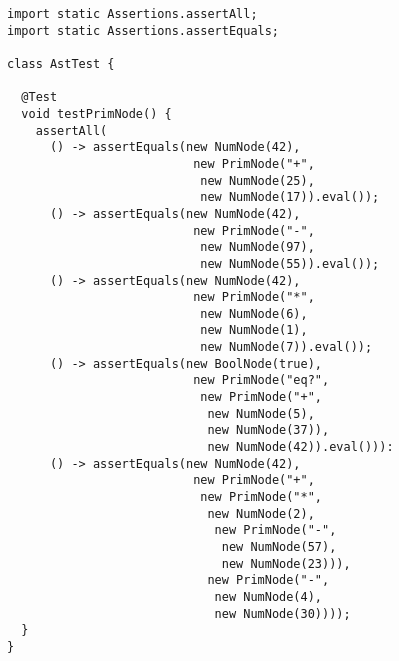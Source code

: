 \enlargethispage{-1\baselineskip}
\begin{lstlisting}[language=MyJava]
import static Assertions.assertAll;
import static Assertions.assertEquals;

class AstTest {

  @Test
  void testPrimNode() {
    assertAll(
      () -> assertEquals(new NumNode(42),
                          new PrimNode("+", 
                           new NumNode(25), 
                           new NumNode(17)).eval());
      () -> assertEquals(new NumNode(42),
                          new PrimNode("-", 
                           new NumNode(97), 
                           new NumNode(55)).eval());                         
      () -> assertEquals(new NumNode(42),
                          new PrimNode("*", 
                           new NumNode(6), 
                           new NumNode(1), 
                           new NumNode(7)).eval());
      () -> assertEquals(new BoolNode(true),
                          new PrimNode("eq?",
                           new PrimNode("+", 
                            new NumNode(5),
                            new NumNode(37)),
                            new NumNode(42)).eval())):
      () -> assertEquals(new NumNode(42),
                          new PrimNode("+",
                           new PrimNode("*",
                            new NumNode(2), 
                             new PrimNode("-",
                              new NumNode(57),
                              new NumNode(23))),
                            new PrimNode("-",
                             new NumNode(4),
                             new NumNode(30))));           
  }
}
\end{lstlisting}


